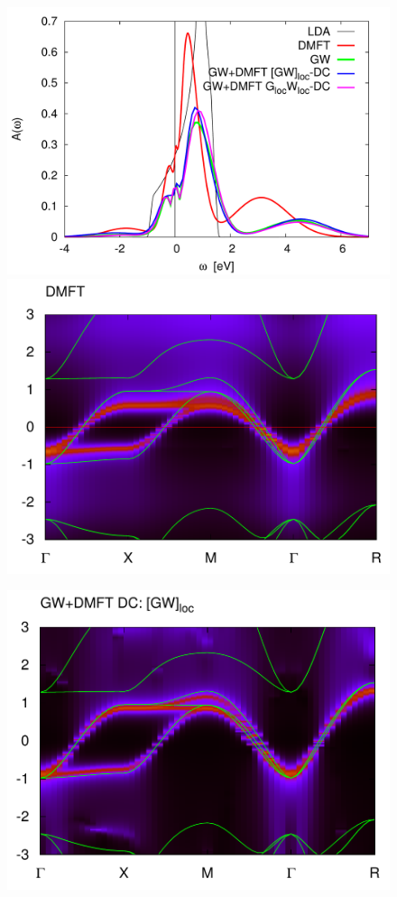 \documentclass[12pt,a4paper]{scrartcl}
\numberwithin{equation}{section}
\begin{document}
\clearpage

\begin{figure}[h]
\begin{minipage}{0.5\textwidth}
\includegraphics[width=1\textwidth]{figs/results/SrVO3_specFunc_comparison.pdf} 
\includegraphics[width=1\textwidth]{figs/results/SrVO3_bands_DMFT.png}  
\end{minipage}
\begin{minipage}{0.5\textwidth}
\includegraphics[width=1\textwidth]{figs/results/SrVO3_bands_GWDMFT_gwl.png}  

\end{minipage}
\end{figure}
\end{document}
